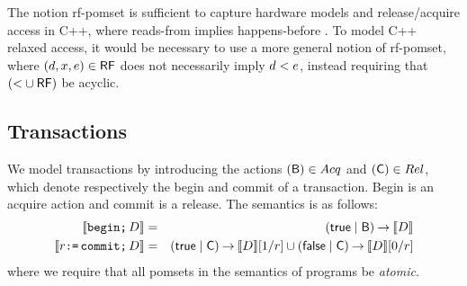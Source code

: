 
The notion rf-pomset is sufficient to capture hardware models and
release/acquire access in C++, where reads-from implies happens-before
\cite{alglave}.  To model C++ relaxed access, it
would be necessary to use a more general notion of rf-pomset, where
$(d,x,e) \in \mathsf{RF}$ does not necessarily imply $d < e$, instead
requiring that $(\mathord< \cup \mathord{\mathsf{RF}})$ be acyclic.

\subsection{Transactions}
\label{sec:transactions}

We model transactions by introducing the actions
$(\mathsf{B}) \in Acq$ and
$(\mathsf{C}) \in Rel$, which denote respectively the begin and commit of a transaction.
Begin is an acquire action and commit is a release.
The semantics is as follows:
\begin{eqnarray*}
  \llbracket\texttt{begin}\texttt{;}\, D\rrbracket
  & = & 
  (\mathsf{true} \mid \mathsf{B}) \mathbin\rightarrow \llbracket D\rrbracket
  \\
  \llbracket r\texttt{:=}\,\texttt{commit}\texttt{;}\, D\rrbracket
  & = &
  (\mathsf{true} \mid \mathsf{C}) \mathbin\rightarrow \llbracket D\rrbracket[1/r]
  \cup
  (\mathsf{false} \mid \mathsf{C}) \mathbin\rightarrow \llbracket D\rrbracket[0/r]
\end{eqnarray*}
where we require that all pomsets in the semantics of programs be
\emph{atomic}.

